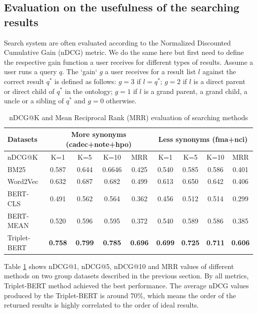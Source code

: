 \documentclass[preprint,12pt]{elsarticle}
\begin{document}
\subsection*{Evaluation on the usefulness of the searching results}
\label{sec:EvaluationNDCG}

Search system are often evaluated according to the Normalized Discounted Cumulative Gain (nDCG) metric. We do the same here but first need to define the respective gain function a user receives for different types of results. Assume a user runs a query $q$. The `gain` $g$ a user receives for a result list $l$ against the correct result $q^{*}$ is defined as follows: $g=3$ if $l = q^{*}$; $g=2$ if $l$ is a direct parent or direct child of $q^{*}$ in the ontology; $g=1$ if $l$ is a grand parent, a grand child, a uncle or a sibling of $q^{*}$ and $g=0$ otherwise. 

\begin{table}[htbp]
\small
\centering
\caption{nDCG@K and Mean Reciprocal Rank (MRR) evaluation of searching methods}
\vspace{-0.5em}
\label{tab:nDCG}
    \begin{tabular}{ |l|c|c|c|c|c|c|c|c|} 
        \hline
         Datasets & \multicolumn{4}{|c|}{More synonyms (cadec+note+hpo)} & \multicolumn{4}{|c|}{Less synonyms (fma+nci)}\\
        \hline
         nDCG@K & K=1 & K=5 & K=10 & MRR & K=1 & K=5 & K=10 & MRR \\
        \hline
        \hline
        BM25 & 0.587 & 0.644 & 0.6646 & 0.425 & 0.540 & 0.585 & 0.586 & 0.401\\
        Word2Vec & 0.632 & 0.687 & 0.682 & 0.499 & 0.613 & 0.650 & 0.642 & 0.406\\
        BERT-CLS & 0.491 & 0.562 & 0.564 & 0.362 & 0.456 & 0.512 & 0.514 & 0.299\\
        BERT-MEAN & 0.520 & 0.596 & 0.595 & 0.372 & 0.540 & 0.589 & 0.586 & 0.385\\
        Triplet-BERT & \textbf{0.758} & \textbf{0.799} & \textbf{0.785} & \textbf{0.696} & \textbf{0.699} & \textbf{0.725} & \textbf{0.711} & \textbf{0.606}\\
        \hline
    \end{tabular}
\end{table} 

Table \ref{tab:nDCG} shows nDCG@1, nDCG@5, nDCG@10 and MRR values of different methods on two group datasets described in the previous section. By all metrics, Triplet-BERT method achieved the best performance. The average nDCG values produced by the Triplet-BERT is around 70\%, which means the order of the returned results is highly correlated to the order of ideal results.
\end{document}
